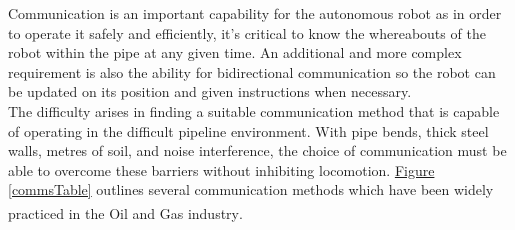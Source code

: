 \documentclass[11pt]{article}		%
\newcommand{\supercite}[1]{\textsuperscript{\cite{#1}}}		%
\newcommand{\figref}[1]{\hyperref[#1]{Figure \ref*{#1}}}    %
\begin{document}
		Communication is an important capability for the autonomous robot as in order to operate it safely and efficiently, it's critical to know the whereabouts of the robot within the pipe at any given time. 
		An additional and more complex requirement is also the ability for bidirectional communication so the robot can be updated on its position and given instructions when necessary. 
		\\
	    The difficulty arises in finding a suitable communication method that is capable of operating in the difficult pipeline environment. 
	    With pipe bends, thick steel walls, metres of soil, and noise interference, the choice of communication must be able to overcome these barriers without inhibiting locomotion. 
	    \figref{commsTable} outlines several communication methods which have been widely practiced in the Oil and Gas industry\supercite{acoustic2020}.
	    \\
	    
\end{document}

